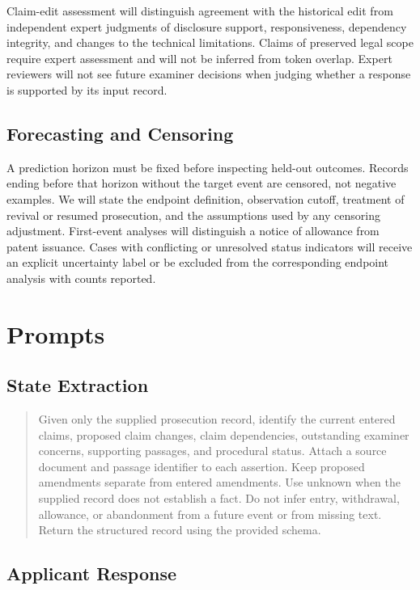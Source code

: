 \documentclass[11pt]{article}
\begin{document}
Claim-edit assessment will distinguish agreement with the historical edit from independent expert judgments of disclosure support, responsiveness, dependency integrity, and changes to the technical limitations. Claims of preserved legal scope require expert assessment and will not be inferred from token overlap. Expert reviewers will not see future examiner decisions when judging whether a response is supported by its input record.

\subsection{Forecasting and Censoring}
\label{sec:appendix-censoring}

A prediction horizon must be fixed before inspecting held-out outcomes. Records ending before that horizon without the target event are censored, not negative examples. We will state the endpoint definition, observation cutoff, treatment of revival or resumed prosecution, and the assumptions used by any censoring adjustment. First-event analyses will distinguish a notice of allowance from patent issuance. Cases with conflicting or unresolved status indicators will receive an explicit uncertainty label or be excluded from the corresponding endpoint analysis with counts reported.

\section{Prompts}
\label{sec:prompts}

\subsection{State Extraction}
\label{sec:prompt-state}

\begin{quote}
Given only the supplied prosecution record, identify the current entered claims, proposed claim changes, claim dependencies, outstanding examiner concerns, supporting passages, and procedural status. Attach a source document and passage identifier to each assertion. Keep proposed amendments separate from entered amendments. Use unknown when the supplied record does not establish a fact. Do not infer entry, withdrawal, allowance, or abandonment from a future event or from missing text. Return the structured record using the provided schema.
\end{quote}

\subsection{Applicant Response}
\label{sec:prompt-response}
\end{document}
